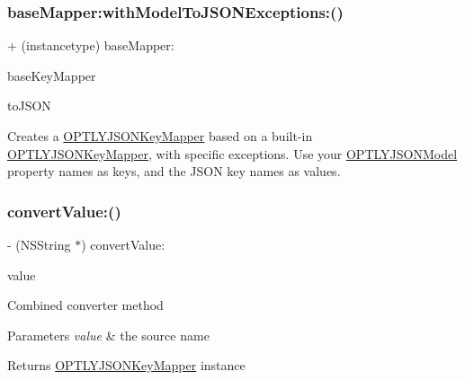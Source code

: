 \subsubsection{\texorpdfstring{base\+Mapper\+:with\+Model\+To\+J\+S\+O\+N\+Exceptions\+:()}{baseMapper:withModelToJSONExceptions:()}}
{\footnotesize\ttfamily + (instancetype) base\+Mapper\+: \begin{DoxyParamCaption}\item[{(\mbox{\hyperlink{interface_o_p_t_l_y_j_s_o_n_key_mapper}{O\+P\+T\+L\+Y\+J\+S\+O\+N\+Key\+Mapper}} $\ast$)}]{base\+Key\+Mapper }\item[{withModelToJSONExceptions:(N\+S\+Dictionary $\ast$)}]{to\+J\+S\+ON }\end{DoxyParamCaption}}

Creates a \mbox{\hyperlink{interface_o_p_t_l_y_j_s_o_n_key_mapper}{O\+P\+T\+L\+Y\+J\+S\+O\+N\+Key\+Mapper}} based on a built-\/in \mbox{\hyperlink{interface_o_p_t_l_y_j_s_o_n_key_mapper}{O\+P\+T\+L\+Y\+J\+S\+O\+N\+Key\+Mapper}}, with specific exceptions. Use your \mbox{\hyperlink{interface_o_p_t_l_y_j_s_o_n_model}{O\+P\+T\+L\+Y\+J\+S\+O\+N\+Model}} property names as keys, and the J\+S\+ON key names as values. \mbox{\label{interface_o_p_t_l_y_j_s_o_n_key_mapper_a03f3e316ddd485b8ccaa9c20f57bdc3d}} 
\subsubsection{\texorpdfstring{convert\+Value\+:()}{convertValue:()}}
{\footnotesize\ttfamily -\/ (N\+S\+String $\ast$) convert\+Value\+: \begin{DoxyParamCaption}\item[{(N\+S\+String $\ast$)}]{value }\end{DoxyParamCaption}}

Combined converter method 
\begin{DoxyParams}{Parameters}
{\em value} & the source name \\
\hline
\end{DoxyParams}
\begin{DoxyReturn}{Returns}
\mbox{\hyperlink{interface_o_p_t_l_y_j_s_o_n_key_mapper}{O\+P\+T\+L\+Y\+J\+S\+O\+N\+Key\+Mapper}} instance 
\end{DoxyReturn}
\mbox{\label{interface_o_p_t_l_y_j_s_o_n_key_mapper_a6a9e531d97d165298a96e9dfe881f3e3}} 
